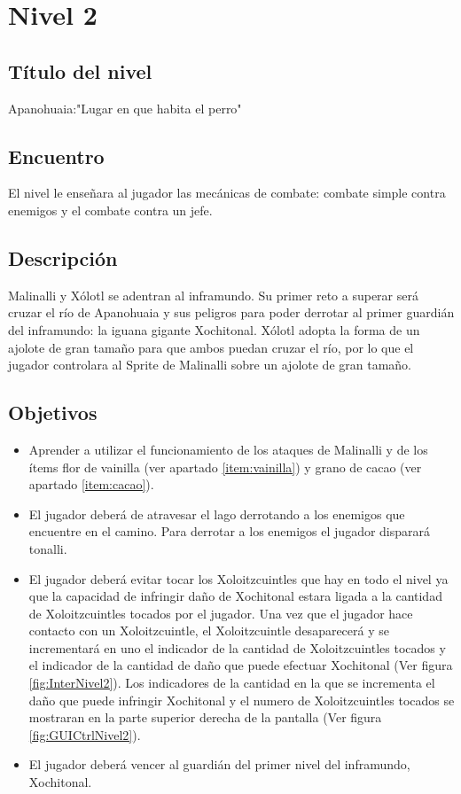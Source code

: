 \section{Nivel 2} \label{Nivel:Niv02}
	\subsection{Título del nivel}
	Apanohuaia:"Lugar en que habita el perro"
	\subsection{Encuentro}
El nivel le enseñara al jugador las mecánicas de combate: combate simple contra enemigos y el combate contra un jefe. 
	\subsection{Descripción}
Malinalli y Xólotl se adentran al inframundo. Su primer reto a superar será cruzar el río de Apanohuaia y sus peligros para poder derrotar al primer guardián del inframundo: la iguana gigante Xochitonal. Xólotl adopta la forma de un ajolote de gran tamaño para que ambos puedan cruzar el río, por lo que el jugador controlara al Sprite de Malinalli sobre un ajolote de gran tamaño. 
	\subsection{Objetivos}
\begin{itemize}
	\item Aprender a utilizar el funcionamiento de los ataques de Malinalli y de los ítems flor de vainilla (ver apartado \ref{item:vainilla}) y grano de cacao (ver apartado \ref{item:cacao}).
	\item El jugador deberá de atravesar el lago derrotando a los enemigos que encuentre en el camino. Para derrotar a los enemigos el jugador disparará tonalli.
	\item El jugador deberá evitar tocar los Xoloitzcuintles que hay en todo el nivel ya que la capacidad de infringir daño de Xochitonal estara ligada a la cantidad de Xoloitzcuintles tocados por el jugador. Una vez que el jugador hace contacto con un Xoloitzcuintle, el Xoloitzcuintle desaparecerá y se incrementará en uno el indicador de la cantidad de Xoloitzcuintles tocados y el indicador de la cantidad de daño que puede efectuar Xochitonal (Ver figura \ref{fig:InterNivel2}). Los indicadores de la cantidad en la que se incrementa el daño que puede infringir Xochitonal y el numero de Xoloitzcuintles tocados se mostraran en la parte superior derecha de la pantalla (Ver figura \ref{fig:GUICtrlNivel2}).
	\item El jugador deberá vencer al guardián del primer nivel del inframundo, Xochitonal.
\end{itemize}

